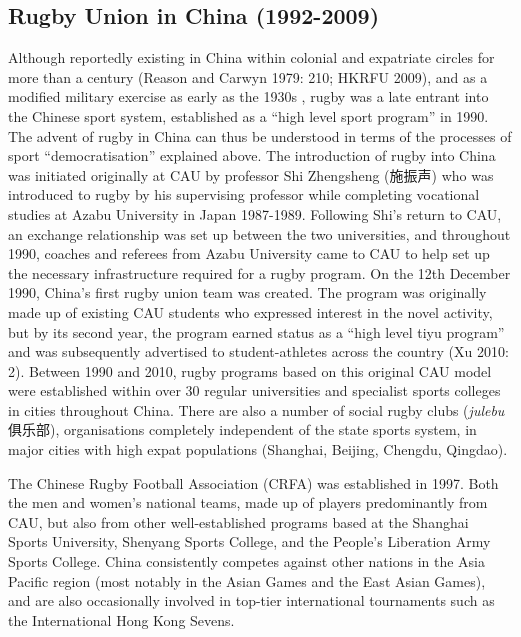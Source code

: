 {    \subsection{Rugby Union in China (1992-2009)}
Although reportedly existing in China within colonial and expatriate circles for more than a century (Reason and Carwyn 1979: 210; HKRFU 2009), and as a modified military exercise as early as the 1930s \citep[135]{Morris2004}, rugby was a late entrant into the Chinese sport system, established as a ``high level sport program'' in 1990.  The advent of rugby in China can thus be understood in terms of the processes of sport ``democratisation'' explained above.  The introduction of rugby into China was initiated originally at CAU by professor Shi Zhengsheng (施振声) who was introduced to rugby by his
supervising professor while completing vocational studies at Azabu University in Japan 1987-1989.  Following Shi’s return to CAU, an exchange relationship was set up between the two universities, and throughout 1990, coaches and referees from Azabu University came to CAU to help set up the necessary infrastructure required for a rugby program.  On the 12th December 1990, China’s first rugby union team was created.  The program was originally made up of existing CAU students who expressed interest in the novel activity, but by its second year, the program earned status as a “high level tiyu program” and was subsequently advertised to student-athletes across the country (Xu 2010: 2).  Between 1990 and 2010, rugby programs based on this original CAU model were established within over 30 regular universities and specialist sports colleges in cities throughout China.  There are also a number of social rugby clubs (\textit{julebu} 俱乐部), organisations completely independent of the state sports system, in major cities with high expat populations (Shanghai, Beijing, Chengdu, Qingdao).

The Chinese Rugby Football Association (CRFA) was established in 1997. Both the men and women’s national teams, made up of players predominantly from CAU, but also from other well-established programs based at the Shanghai Sports University, Shenyang Sports College, and the People’s Liberation Army Sports College. China consistently competes against other nations in the Asia Pacific region (most notably in the Asian Games and the East Asian Games), and are also occasionally involved in top-tier international tournaments such as the International Hong Kong Sevens.

}
